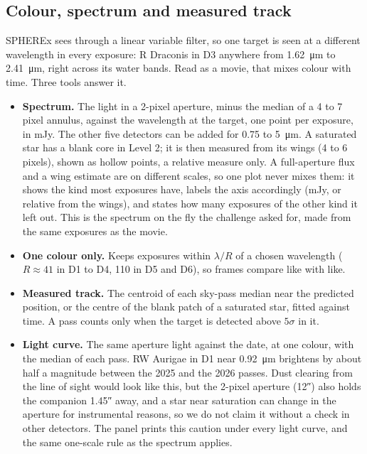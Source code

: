 \documentclass[11pt,a4paper]{article}
\begin{document}
\subsection{Colour, spectrum and measured track}
SPHEREx sees through a linear variable filter, so one target is seen at a different wavelength in
every exposure: R Draconis in D3 anywhere from \SI{1.62}{\micro\metre} to \SI{2.41}{\micro\metre},
right across its water bands. Read as a movie, that mixes colour with time. Three tools answer it.
\begin{itemize}
  \item \textbf{Spectrum.} The light in a 2-pixel aperture, minus the median of a 4 to 7 pixel
        annulus, against the wavelength at the target, one point per exposure, in mJy. The other
        five detectors can be added for 0.75 to \SI{5}{\micro\metre}. A saturated star has a blank
        core in Level 2; it is then measured from its wings (4 to 6 pixels), shown as hollow points,
        a relative measure only. A full-aperture flux and a wing estimate are on different scales,
        so one plot never mixes them: it shows the kind most exposures have, labels the axis
        accordingly (mJy, or relative from the wings), and states how many exposures of the other
        kind it left out. This is the spectrum on the fly the challenge asked for, made from
        the same exposures as the movie.
  \item \textbf{One colour only.} Keeps exposures within $\lambda/R$ of a chosen wavelength
        ($R \approx 41$ in D1 to D4, 110 in D5 and D6), so frames compare like with like.
  \item \textbf{Measured track.} The centroid of each sky-pass median near the predicted position,
        or the centre of the blank patch of a saturated star, fitted against time. A pass counts
        only when the target is detected above $5\sigma$ in it.
  \item \textbf{Light curve.} The same aperture light against the date, at one colour, with the
        median of each pass. RW Aurigae in D1 near \SI{0.92}{\micro\metre} brightens by about half
        a magnitude between the 2025 and the 2026 passes. Dust clearing from the line of sight would
        look like this, but the 2-pixel aperture (\ang{;;12}) also holds the companion
        \ang{;;1.45} away, and a star near saturation can change in the aperture for instrumental
        reasons, so we do not claim it without a check in other detectors. The panel prints this
        caution under every light curve, and the same one-scale rule as the spectrum applies.
\end{itemize}
\end{document}
